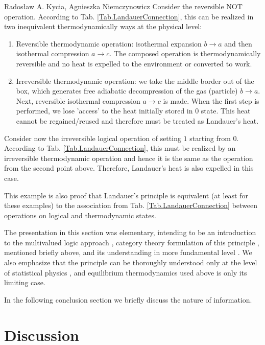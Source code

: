 \begin{artengenv2auth}{Rados\l aw A. Kycia, Agnieszka Niemczynowicz}
Consider the reversible NOT operation. According to Tab. \ref{Tab.LandauerConnection}, this can be realized in two inequivalent thermodynamically ways at the physical level:
\begin{enumerate}
 \item {Reversible thermodynamic operation: isothermal expansion $b \rightarrow a$ and then isothermal compression $a \rightarrow c$. The composed operation is thermodynamically reversible and no heat is expelled to the environment or converted to work.}
 \item {Irreversible thermodynamic operation: we take the middle border out of the box, which generates free adiabatic decompression of the gas (particle) $b \rightarrow a$. Next, reversible isothermal compression $a \rightarrow c$ is made. When the first step is performed, we lose 'access' to the heat initially stored in $0$ state. This heat cannot be regained/reused and therefore must be treated as Landauer's heat.}
\end{enumerate}


Consider now the irreversible logical operation of setting $1$ starting from $0$. According to Tab. \ref{Tab.LandauerConnection}, this must be realized by an irreversible thermodynamic operation and hence it is the same as the operation from the second point above. Therefore, Landauer's heat is also expelled in this case.

This example is also proof that Landauer's principle is equivalent (at least for these examples) to the association from Tab. \ref{Tab.LandauerConnection} between operations on logical and thermodynamic states.


The presentation in this section was elementary, intending to be an introduction to the multivalued logic approach \parencites{KyciaNiemczynowicz, TritLandauer}, category theory formulation of this principle \parencites{KyciaLandauer, KyciaLandauer2}, mentioned briefly above, and its understanding in more fundamental level \parencite{LandauerExplained}. We also emphasize that the principle can be thoroughly understood only at the level of statistical physics \parencites{LandauerExplainedFull, Piechocinska}, and equilibrium thermodynamics used above is only its limiting case.

In the following conclusion section we briefly discuss the nature of information.


\section{Discussion}


\end{artengenv2auth}
